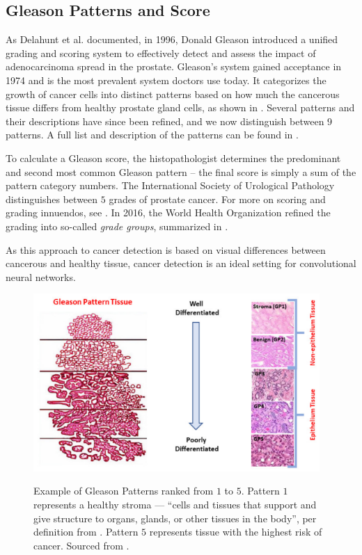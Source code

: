 \subsection*{Gleason Patterns and Score}

As Delahunt et al. \cite{gleason-patterns} documented, in 1996, Donald Gleason introduced a unified grading and scoring system to effectively detect and assess the impact of adenocarcinoma spread in the prostate.
Gleason's system gained acceptance in 1974 and is the most prevalent system doctors use today.
It categorizes the growth of cancer cells into distinct patterns based on how much the cancerous tissue differs from healthy prostate gland cells, as shown in .
Several patterns and their descriptions have since been refined, and we now distinguish between 9 patterns.
A full list and description of the patterns can be found in \cite{gleason-patterns}.

To calculate a Gleason score, the histopathologist determines the predominant and second most common Gleason pattern -- the final score is simply a sum of the pattern category numbers.
The International Society of Urological Pathology distinguishes between $5$ grades of prostate cancer.
For more on scoring and grading innuendos, see \cite{gleason-pattern-grading}.
In 2016, the World Health Organization refined the grading into so-called \emph{grade groups}, summarized in \cite{who-grade-groups}.

As this approach to cancer detection is based on visual differences between cancerous and healthy tissue, cancer detection is an ideal setting for convolutional neural networks.

\begin{figure}
    \centering
      {\includegraphics[width=0.97\textwidth]{img/gp-classification.png}}
    \caption{Example of Gleason Patterns ranked from $1$ to $5$. Pattern $1$ represents a healthy stroma --- ``cells and tissues that support and give structure to organs, glands, or other tissues in the body'', per definition from \cite{nci-stroma}. Pattern $5$ represents tissue with the highest risk of cancer. Sourced from \cite{gleason-pattern-description}.}
    \label{fig:gp}
\end{figure}

